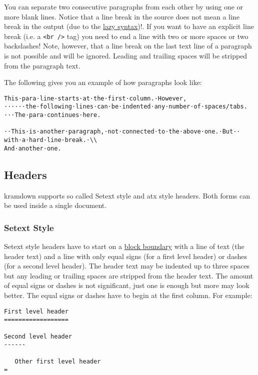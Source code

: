 \documentclass[a4paper]{article}
\begin{document}
You can separate two consecutive paragraphs from each other by using one
or more blank lines. Notice that a line break in the source does not
mean a line break in the output (due to the
\protect\hyperlink{line-wrapping}{lazy syntax})!. If you want to have an
explicit line break (i.e. a \texttt{\textless{}br\ /\textgreater{}} tag)
you need to end a line with two or more spaces or two backslashes! Note,
however, that a line break on the last text line of a paragraph is not
possible and will be ignored. Leading and trailing spaces will be
stripped from the paragraph text.

The following gives you an example of how paragraphs look like:

\begin{verbatim}
This⋅para⋅line⋅starts⋅at⋅the⋅first⋅column.⋅However,
⋅⋅⋅⋅⋅⋅the⋅following⋅lines⋅can⋅be⋅indented⋅any⋅number⋅of⋅spaces/tabs.
⋅⋅⋅The⋅para⋅continues⋅here.

⋅⋅This⋅is⋅another⋅paragraph,⋅not⋅connected⋅to⋅the⋅above⋅one.⋅But⋅⋅
with⋅a⋅hard⋅line⋅break.⋅\\
And⋅another⋅one.
\end{verbatim}

\hypertarget{headers}{\subsection{Headers}\label{headers}}

kramdown supports so called Setext style and atx style headers. Both
forms can be used inside a single document.

\hypertarget{setext-style}{\subsubsection{Setext
Style}\label{setext-style}}

Setext style headers have to start on a
\protect\hyperlink{block-boundaries}{block boundary} with a line of text
(the header text) and a line with only equal signs (for a first level
header) or dashes (for a second level header). The header text may be
indented up to three spaces but any leading or trailing spaces are
stripped from the header text. The amount of equal signs or dashes is
not significant, just one is enough but more may look better. The equal
signs or dashes have to begin at the first column. For example:

\begin{verbatim}
First level header
==================

Second level header
------

   Other first level header
=
\end{verbatim}
\end{document}
